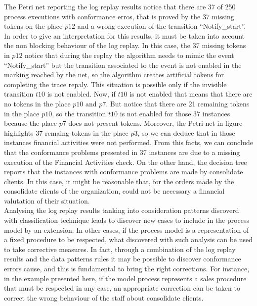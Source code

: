 \documentclass[11pt]{article}
\begin{document}
The Petri net reporting the log replay results notice that there are 37 of 250 process executions with conformance erros, that is proved by the 37 missing tokens on the place $p12$ and a wrong execution of the transition ``Notify\_start''. In order to give an interpretation for this results, it must be taken into account the non blocking behaviour of the log replay. In this case, the 37 missing tokens in $p12$ notice that during the replay the algorithm needs to mimic the event ``Notify\_start'' but the transition associated to the event is not enabled in the marking reached by the net, so the algorithm creates artificial tokens for completing the trace repaly. This situation is possible only if the invisible transition $t10$ is not enabled. Now, if $t10$ is not enabled that means that there are no tokens in the place $p10$ and $p7$. But notice that there are 21 remaining tokens in the place $p10$, so the transition $t10$ is not enabled for those $37$ instances because the place $p7$ does not present tokens. Moreover, the Petri net in figure highlights 37 remaing tokens in the place $p3$, so we can deduce that in those instances financial activities were not performed. From this facts, we can conclude that the conformance problems presented in  37 instances are due to a missing execution of the Financial Activities check. On the other hand, the decision tree reports that the instances with conformance problems are made by consolidate clients. In this case, it might be reasonable that, for the orders made by the consolidate clients of the organization, could not be necessary a financial valutation of their situation.\\

Analysing the log replay results tanking into consideration patterns discoverd with classification technique leads to discover new cases to include in the process model by an extension. In other cases, if the process model is a representation of a fixed procedure to be respected, what discovered with such analysis can be used to take corrective measures. In fact, through a combination of the log replay results and the data patterns rules it may be possible to discover conformance errors cause, and this is fundamental to bring the right corrections. For instance, in the example presented here, if the model process represents a sales procedure that must be respected in any case, an appropriate correction can be taken to correct the wrong behaviour of the staff about consolidate clients. 
\end{document}

